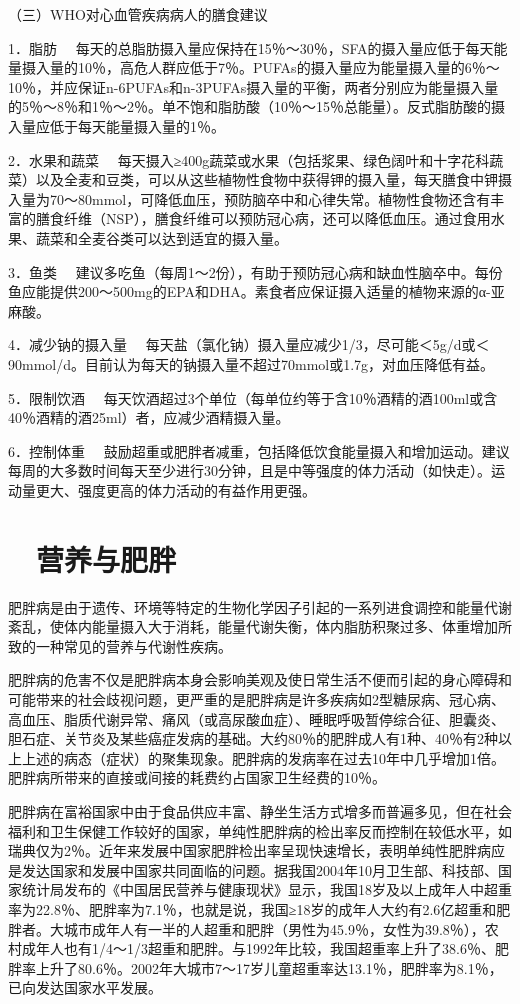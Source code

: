 （三）WHO对心血管疾病病人的膳食建议

{1．脂肪}
　每天的总脂肪摄入量应保持在15％～30％，SFA的摄入量应低于每天能量摄入量的10％，高危人群应低于7％。PUFAs的摄入量应为能量摄入量的6％～10％，并应保证n-6PUFAs和n-3PUFAs摄入量的平衡，两者分别应为能量摄入量的5％～8％和1％～2％。单不饱和脂肪酸（10％～15％总能量）。反式脂肪酸的摄入量应低于每天能量摄入量的1％。

{2．水果和蔬菜}
　每天摄入≥400g蔬菜或水果（包括浆果、绿色阔叶和十字花科蔬菜）以及全麦和豆类，可以从这些植物性食物中获得钾的摄入量，每天膳食中钾摄入量为70～80mmol，可降低血压，预防脑卒中和心律失常。植物性食物还含有丰富的膳食纤维（NSP），膳食纤维可以预防冠心病，还可以降低血压。通过食用水果、蔬菜和全麦谷类可以达到适宜的摄入量。

{3．鱼类}
　建议多吃鱼（每周1～2份），有助于预防冠心病和缺血性脑卒中。每份鱼应能提供200～500mg的EPA和DHA。素食者应保证摄入适量的植物来源的α-亚麻酸。

{4．减少钠的摄入量}
　每天盐（氯化钠）摄入量应减少1/3，尽可能＜5g/d或＜90mmol/d。目前认为每天的钠摄入量不超过70mmol或1.7g，对血压降低有益。

{5．限制饮酒}
　每天饮酒超过3个单位（每单位约等于含10％酒精的酒100ml或含40％酒精的酒25ml）者，应减少酒精摄入量。

{6．控制体重}
　鼓励超重或肥胖者减重，包括降低饮食能量摄入和增加运动。建议每周的大多数时间每天至少进行30分钟，且是中等强度的体力活动（如快走）。运动量更大、强度更高的体力活动的有益作用更强。

\hypertarget{text00004.htmlux5cux23mllj11}{%
\section{　营养与肥胖}\label{text00004.htmlux5cux23mllj11}}

肥胖病是由于遗传、环境等特定的生物化学因子引起的一系列进食调控和能量代谢紊乱，使体内能量摄入大于消耗，能量代谢失衡，体内脂肪积聚过多、体重增加所致的一种常见的营养与代谢性疾病。

肥胖病的危害不仅是肥胖病本身会影响美观及使日常生活不便而引起的身心障碍和可能带来的社会歧视问题，更严重的是肥胖病是许多疾病如2型糖尿病、冠心病、高血压、脂质代谢异常、痛风（或高尿酸血症）、睡眠呼吸暂停综合征、胆囊炎、胆石症、关节炎及某些癌症发病的基础。大约80％的肥胖成人有1种、40％有2种以上上述的病态（症状）的聚集现象。肥胖病的发病率在过去10年中几乎增加1倍。肥胖病所带来的直接或间接的耗费约占国家卫生经费的10％。

肥胖病在富裕国家中由于食品供应丰富、静坐生活方式增多而普遍多见，但在社会福利和卫生保健工作较好的国家，单纯性肥胖病的检出率反而控制在较低水平，如瑞典仅为2％。近年来发展中国家肥胖检出率呈现快速增长，表明单纯性肥胖病应是发达国家和发展中国家共同面临的问题。据我国2004年10月卫生部、科技部、国家统计局发布的《中国居民营养与健康现状》显示，我国18岁及以上成年人中超重率为22.8％、肥胖率为7.1％，也就是说，我国≥18岁的成年人大约有2.6亿超重和肥胖者。大城市成年人有一半的人超重和肥胖（男性为45.9％，女性为39.8％），农村成年人也有1/4～1/3超重和肥胖。与1992年比较，我国超重率上升了38.6％、肥胖率上升了80.6％。2002年大城市7～17岁儿童超重率达13.1％，肥胖率为8.1％，已向发达国家水平发展。

